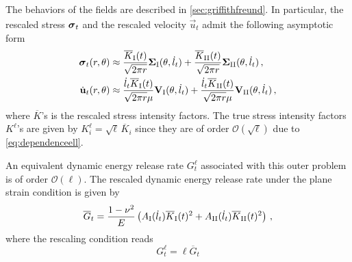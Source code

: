 The behaviors of the fields are described in \cref{sec:griffithfreund}. In particular, the rescaled stress $\sig_t$ and the rescaled velocity $\dot{\vec{u}}_t$ admit the following asymptotic form
\begin{equation} \label{eq:singularforms}
\begin{aligned}
\sig_t(r,\theta) &\approx \frac{\overline{K}_\RNN{1}(t)}{\sqrt{2\pi r}}\vec{\Sigma}_\RNN{1}(\theta,\dot{l}_t)+\frac{\overline{K}_\RNN{2}(t)}{\sqrt{2\pi r}}\vec{\Sigma}_\RNN{2}(\theta,\dot{l}_t)\,, \\
\dot{\vec{u}}_t(r,\theta) &\approx \frac{\dot{l}_t\overline{K}_\RNN{1}(t)}{\sqrt{2\pi r}\mu}\vec{V}_\RNN{1}(\theta,\dot{l}_t)+\frac{\dot{l}_t\overline{K}_\RNN{2}(t)}{\sqrt{2\pi r}\mu}\vec{V}_\RNN{2}(\theta,\dot{l}_t)\,,
\end{aligned}
\end{equation}
where $\overline{K}$'s is the rescaled stress intensity factors. The true stress intensity factors $K^\ell$'s are given by $K_i^\ell=\sqrt{\ell}\,\overline{K}_i$ since they are of order $\mathcal{O}(\sqrt{\ell})$ due to \eqref{eq:dependenceell}.

An equivalent dynamic energy release rate $G_t^\ell$ associated with this outer problem is of order $\mathcal{O}(\ell)$. The rescaled dynamic energy release rate under the plane strain condition is given by
\begin{equation} \label{eq:GasafunctionofKs}
\overline{G}_t=\frac{1-\nu^2}{E}\left(A_\RNN{1}(\dot{l}_t)\overline{K}_\RNN{1}(t)^2+A_\RNN{2}(\dot{l}_t)\overline{K}_\RNN{2}(t)^2\right)\,,
\end{equation}
where the rescaling condition reads
\begin{equation} \label{eq:Gtell}
G_t^\ell=\ell\overline{G}_t
\end{equation}

